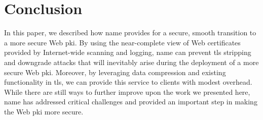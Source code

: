 \section{Conclusion}
\label{sec:conclusion}

In this paper, we described how \ac{name} provides for a secure, smooth
transition to a more secure Web \ac{pki}. By using the near-complete view of Web
certificates provided by Internet-wide scanning and logging, \ac{name} can
prevent \ac{tls} stripping and downgrade attacks that will inevitably arise
during the deployment of a more secure Web \ac{pki}. Moreover, by leveraging
data compression and existing functionality in \ac{tls}, we can provide this
service to clients with modest overhead. While there are still ways to further
improve upon the work we presented here, \ac{name} has addressed critical
challenges and provided an important step in making the Web \ac{pki} more
secure.
